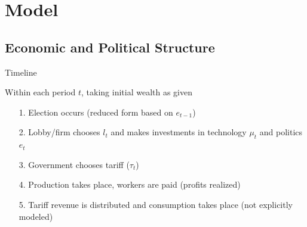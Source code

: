\documentclass[handout]{beamer}
\begin{document}

 








\section{Model}
\subsection{Economic and Political Structure}
\begin{frame}{Timeline}
\pause

Within each period $t$, taking initial wealth as given
\pause
\begin{enumerate}[<+->]
	\item[1.] Election occurs (reduced form based on $e_{t-1}$)
	\item[2.] Lobby/firm chooses $l_t$ and makes investments in technology $\mu_t$ and politics $e_t$
	\item[3.] Government chooses tariff ($\tau_t$)
	\item[4.] Production takes place, workers are paid (profits realized)
	\item[5.] Tariff revenue is distributed and consumption takes place (not explicitly modeled)
\end{enumerate}
\end{frame}
\end{document}
